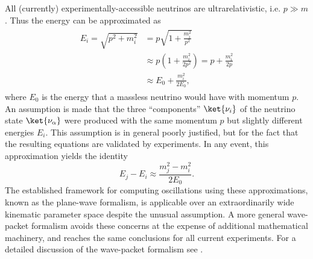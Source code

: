 All (currently) experimentally-accessible neutrinos are ultrarelativistic,
i.e. $p \gg m$.
Thus the energy can be approximated as
\begin{align}\label{eq:energy_approx}
    \begin{split}
        E_i = \sqrt{p^2 + m_i^2}
        &= p\sqrt{1 + \frac{m_i^2}{p^2}} \\
        &\approx p\left(1 + \frac{m_i^2}{2p^2}\right) = p + \frac{m_i^2}{2p} \\
        &\approx E_0 + \frac{m_i^2}{2E_0},
    \end{split}
\end{align}
where $E_0$ is the energy that a massless neutrino would have with momentum $p$.
An assumption is made that the three ``components'' $\ket{\nu_i}$
of the neutrino state $\ket{\nu_\alpha}$
were produced with the same momentum $p$ but slightly different energies $E_i$.
This assumption is in general poorly justified,
but for the fact that the resulting equations are validated by experiments.
In any event, this approximation yields the identity
\begin{equation}\label{eq:msq_approx}
    E_j - E_i \approx \frac{m_j^2 - m_i^2}{2E_0}.
\end{equation}
The established framework for computing oscillations
using these approximations, known as the plane-wave formalism,
is applicable over an extraordinarily wide
kinematic parameter space despite the unusual assumption.
A more general wave-packet formalism avoids these concerns
at the expense of additional mathematical machinery,
and reaches the same conclusions for all current experiments.
For a detailed discussion of the wave-packet formalism see
\cite[Ch.\ 8 of]{neutrino_textbook}.

